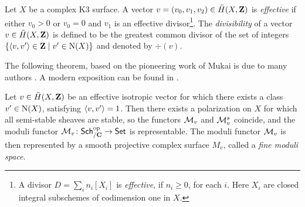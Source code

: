 \begin{definition}
    Let $X$ be a complex K3 surface. A vector $v = (v_0, v_1, v_2) \in \,\tilde{\!{H}}(X, \mathbf Z)$ is \emph{effective} if either $v_0 > 0$ or $v_0 = 0$ and $v_1$ is an effective divisor\footnote{
        A divisor $D = \sum_i n_i[X_i]$ is \emph{effective}, if $n_i \geq 0$, for each $i$. Here $X_i$ are closed integral subschemes of codimension one in $X$.
    }. The \emph{divisibility} of a vector $v \in \,\tilde{\!{H}}(X, \mathbf Z)$ is defined to be the greatest common divisor of the set of integers $\{\langle v, v' \rangle \in \mathbf Z \mid v' \in \operatorname{N}(X)\}$ and denoted by $\div(v)$. 
\end{definition}


The following theorem, based on the pioneering work of Mukai \cite{Mukai1987} is due to many authors \cite{GottscheHuybrechts1996,huybrechts2006fouriermukai, OGrady1997}. A modern exposition can be found in \cite{BayerMacri2014}.

\begin{theorem}
    \label{Representability of moduli functor}
    \textsl{\cite{GottscheHuybrechts1996,huybrechts2006fouriermukai, OGrady1997,HuybrechtsLehn2010,BayerMacri2014}}
    Let $v \in \,\tilde{\!{H}}(X, \mathbf Z)$ be an effective isotropic vector for which there exists a class $v' \in \operatorname{N}(X)$, satisfying $\langle v, v' \rangle = 1$. Then there exists a polarization on $X$ for which all semi-stable sheaves are stable, so the functors $\mathcal M_v$ and $\mathcal M^s_v$ coincide, and the moduli functor $\mathcal M_v \colon \mathsf{Sch}_{/\mathbf C}^{\text{op}} \to \mathsf{Set}$ is representable. The moduli functor $\mathcal M_v$ is then represented by a smooth projective complex surface $M_v$, called a \emph{fine moduli space}.
\end{theorem}

